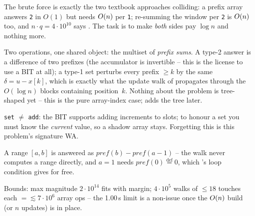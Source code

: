 \begin{attemptgate}
The brute force is exactly the two textbook approaches colliding: a prefix
array answers \texttt{2} in \(O(1)\) but needs \(O(n)\) per
\texttt{1}; re-summing the window per \texttt{2} is \(O(n)\) too, and
\(n\cdot q=4\cdot10^{10}\) says \tle.  The task is to make \emph{both} sides
pay \(\log n\) and nothing more.
\end{attemptgate}

Two operations, one shared object: the multiset of \emph{prefix sums}.  A
type-2 answer is a difference of two prefixes (the accumulator is invertible
-- this is the license to use a BIT at all); a type-1 set perturbs every
prefix \(\ge k\) by the same \(\delta=u-x[k]\), which is exactly what the
update walk of  propagates through the \(O(\log n)\) blocks
containing position~\(k\).  Nothing about the problem is tree-shaped yet --
this is the pure array-index case;  adds the tree later.

\begin{observation}
\texttt{set} \(\ne\) \texttt{add}: the BIT supports adding increments to
slots; to honour a set you must know the \emph{current} value, so a shadow
array  stays.  Forgetting this is this problem's signature WA.
\end{observation}
\begin{observation}
A range \([a,b]\) is answered as \(\mathit{pref}(b)-\mathit{pref}(a{-}1)\)
-- the walk never computes a range directly, and \(a=1\) needs
\(\mathit{pref}(0)\overset{\text{def}}{=}0\), which 's
loop condition gives for free.
\end{observation}
\begin{observation}
Bounds: max magnitude \(2\cdot10^{14}\) fits  with margin;
\(4\cdot10^5\) walks of \(\le18\) touches each \(=\lesssim7\cdot10^6\) array
ops -- the 1.00\,s limit is a non-issue once the \(O(n)\) build (or
\(n\) updates) is in place.
\end{observation}

